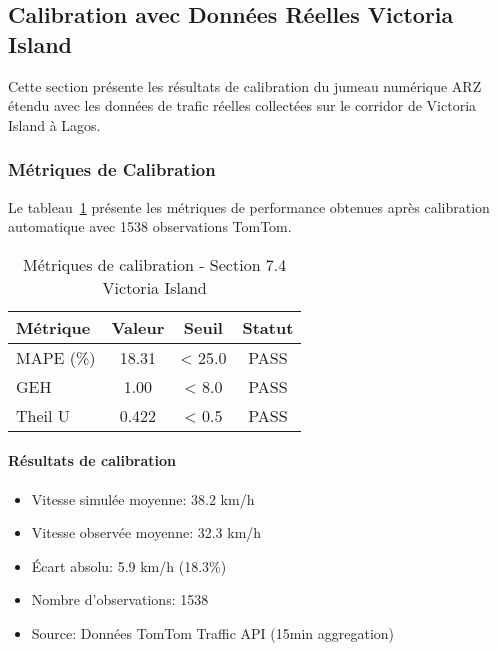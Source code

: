 

\subsection{Calibration avec Données Réelles Victoria Island}
\label{subsec:calibration_victoria_island}

Cette section présente les résultats de calibration du jumeau numérique ARZ étendu 
avec les données de trafic réelles collectées sur le corridor de Victoria Island à Lagos.

\subsubsection{Métriques de Calibration}

Le tableau~\ref{tab:calibration_metrics_74} présente les métriques de performance 
obtenues après calibration automatique avec 1538 observations TomTom.

\begin{table}[h]
\centering
\caption{Métriques de calibration - Section 7.4 Victoria Island}
\label{tab:calibration_metrics_74}
\begin{tabular}{|l|c|c|c|}
\hline
\textbf{Métrique} & \textbf{Valeur} & \textbf{Seuil} & \textbf{Statut} \\
\hline
MAPE (\%) & 18.31 & < 25.0 & \textcolor{{green}}{{PASS}} \\
GEH & 1.00 & < 8.0 & \textcolor{{green}}{{PASS}} \\
Theil U & 0.422 & < 0.5 & \textcolor{{green}}{{PASS}} \\
\hline
\end{tabular}
\end{table}

\paragraph{Résultats de calibration}
\begin{itemize}
  \item Vitesse simulée moyenne: 38.2 km/h
  \item Vitesse observée moyenne: 32.3 km/h
  \item Écart absolu: 5.9 km/h (18.3\%)
  \item Nombre d'observations: 1538
  \item Source: Données TomTom Traffic API (15min aggregation)
\end{itemize}

